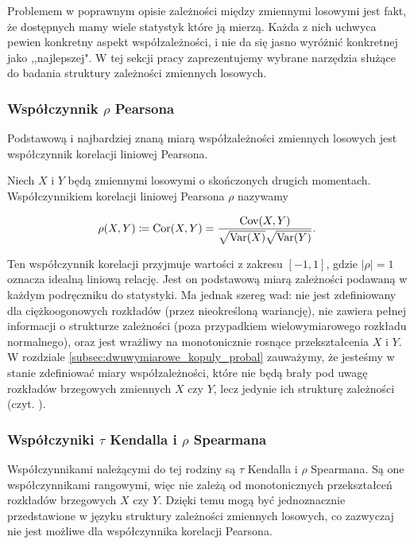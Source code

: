 Problemem w poprawnym opisie zależności między zmiennymi losowymi jest fakt, że dostępnych mamy wiele statystyk które ją mierzą. Każda z nich uchwyca pewien konkretny aspekt współzależności, i nie da się jasno wyróżnić konkretnej jako ,,najlepszej". W tej sekcji pracy zaprezentujemy wybrane narzędzia służące do badania struktury zależności zmiennych losowych.

\subsubsection{Współczynnik $\rho$ Pearsona}
Podstawową i najbardziej znaną miarą współzależności zmiennych losowych jest współczynnik korelacji liniowej Pearsona.

\begin{df}
	Niech $X$ i $Y$ będą zmiennymi losowymi o skończonych drugich momentach. Współczynnikiem korelacji liniowej Pearsona $\rho$ nazywamy
	
	$$ \rho(X, Y) \coloneqq \text{Cor}(X,Y) = \frac{\text{Cov}(X,Y)}{\sqrt{\text{Var}(X)}\sqrt{\text{Var}(Y)}}.$$
\end{df}

Ten współczynnik korelacji przyjmuje wartości z zakresu $[-1, 1]$, gdzie $\vert\rho\vert=1$ oznacza idealną liniową relację. Jest on podstawową miarą zależności podawaną w każdym podręczniku do statystyki. Ma jednak szereg wad: nie jest zdefiniowany dla ciężkoogonowych rozkładów (przez nieokreśloną wariancję), nie zawiera pełnej informacji o strukturze zależności (poza przypadkiem wielowymiarowego rozkładu normalnego), oraz jest wrażliwy na monotonicznie rosnące przekształcenia $X$ i $Y$.\\

W rozdziale \ref{subsec:dwuwymiarowe_kopuly_probal} zauważymy, że jesteśmy w stanie zdefiniować miary współzależności, które nie będą brały pod uwagę rozkładów brzegowych zmiennych $X$ czy $Y$, lecz jedynie ich strukturę zależności (czyt. \cite{Scarsini1984}).

\subsubsection{Współczyniki $\tau$ Kendalla i $\rho$ Spearmana}

Współczynnikami należącymi do tej rodziny są $\tau$ Kendalla i $\rho$ Spearmana. Są one współczynnikami rangowymi, więc nie zależą od monotonicznych przekształceń rozkładów brzegowych $X$ czy $Y$. Dzięki temu mogą być jednoznacznie przedstawione w języku struktury zależności zmiennych losowych, co zazwyczaj nie jest możliwe dla współczynnika korelacji Pearsona.

